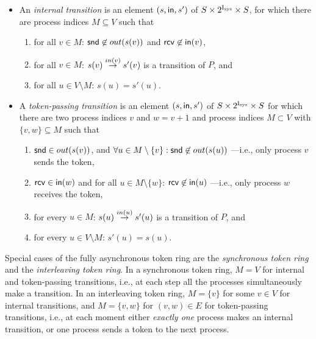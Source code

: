  \begin{itemize}
  \item 
  An {\em internal transition} is an element $(s,{\sf in},s')$ of $S \times 2^\Isys \times S$, for which there are process indices $M \subseteq V$ such that 
  \begin{enumerate}[label*=\roman*)]
    \item
    for all $v \in M$: $\tsnd \not\in out(s(v))$ and $\trcv \not \in{\sf in}(v)$,

    \item 
    for all $v\in M$: $\trans{s(v)}{s'(v)}{in(v)}$ is a transition of $P$, and

    \item 
    for all $u \in V \setminus M$: $s(u) = s'(u)$.
  \end{enumerate}

  \item
  A {\em token-passing transition}  is an element $(s,{\sf in},s')$ of $S \times 2^\Isys \times S$
  for which there are two process indices $v$ and $w=v+1$ and process indices $M \subset V$
  with $\{v,w\} \subseteq M$ such that

  \begin{enumerate}[label*=\roman*)]
    \item
    $\tsnd \in out(s(v))$, 
    and $\forall{u \in M\setminus \{v\}} : \tsnd \not\in out(s(u))$%
    ---i.e., only process $v$ sends the token,

    \item
    $\trcv \in {\sf in}(w)$ and
    for all $u \in M \setminus \{w\}$: $\trcv \not \in{\sf in}(u)$%
    ---i.e., only process $w$ receives the token,

    \item
    for every $u\in M$: $\trans{s(u)}{s'(u)}{in(u)}$ is a transition of $P$, and

    \item
    for every $u \in V \setminus M$: $s'(u) = s(u)$.
  \end{enumerate}

 \end{itemize}
%

Special cases of the fully asynchronous token ring are the \emph{synchronous token ring}
and the \emph{interleaving token ring}.
In a synchronous token ring, $M=V$ for internal and token-passing transitions,
i.e., at each step all the processes simultaneously make a transition.
In an interleaving token ring,
$M = \{v\}$ for some $v\in V$ for internal transitions,
and $M=\{v,w\}$ for $(v,w)\in E$ for token-passing transitions,
i.e., at each moment either \emph{exactly one} process makes an internal transition,
or one process sends a token to the next process.

